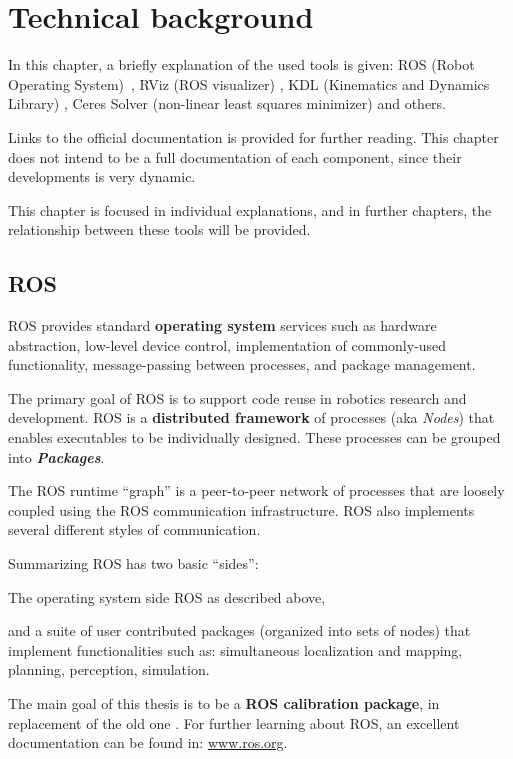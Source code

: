 \chapter{Technical background}
\label{cha:technical_background}

In this chapter, a briefly explanation of the used tools is given: ROS (Robot Operating System)~\cite{ROS}, RViz (ROS visualizer) \cite{RViz}, KDL (Kinematics and Dynamics Library) \cite{KDL}, Ceres Solver (non-linear least squares minimizer) \cite{ceres} and others.

Links to the official documentation is provided for further reading. This chapter does not intend to be a full documentation of each component, since their developments is very dynamic.

This chapter is focused in individual explanations, and in further chapters, the relationship between these tools will be provided.

\section{ROS}
\label{sec:ros}

ROS provides standard \textbf{operating system} services such as hardware abstraction, low-level device control, implementation of commonly-used functionality, message-passing between processes, and package management.

The primary goal of ROS is to support code reuse in robotics research and development. ROS is a \textbf{distributed framework} of processes (aka \textit{Nodes}) that enables executables to be individually designed. These processes can be grouped into \textit{\textbf{Packages}}.

The ROS runtime ``graph'' is a peer-to-peer network of processes that are loosely coupled using the ROS communication infrastructure. ROS also implements several different styles of communication.

Summarizing ROS has two basic ``sides'':
\begin{itemize*}
 \item The operating system side ROS as described above,
 \item and a suite of user contributed packages (organized into sets of nodes) that implement functionalities such as: simultaneous localization and mapping, planning, perception, simulation.
\end{itemize*}

The main goal of this thesis is to be a \textbf{ROS calibration package}, in replacement of the old one \cite{pr2_calibration}. For further learning about ROS, an excellent documentation can be found in: \url{www.ros.org}.

